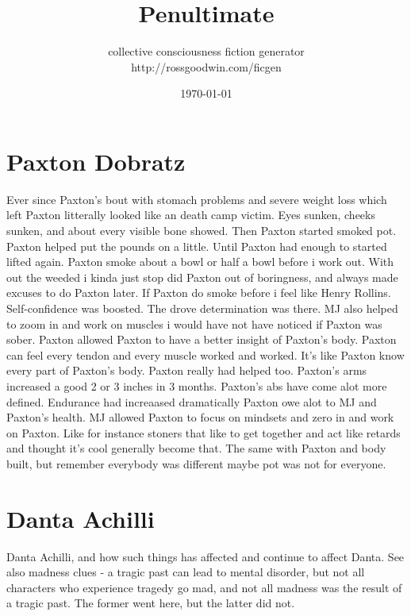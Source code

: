 \documentclass[12pt]{book}
\title{Penultimate}
\author{collective consciousness fiction generator\\http://rossgoodwin.com/ficgen}
\date{\today}
\begin{document}
\maketitle



\chapter{Paxton Dobratz}

Ever since Paxton's bout with stomach problems and severe weight loss which left Paxton litterally looked like an death camp victim. Eyes sunken, cheeks sunken, and about every visible bone showed. Then Paxton started smoked pot. Paxton helped put the pounds on a little. Until Paxton had enough to started lifted again. Paxton smoke about a bowl or half a bowl before i work out. With out the weeded i kinda just stop did Paxton out of boringness, and always made excuses to do Paxton later. If Paxton do smoke before i feel like Henry Rollins. Self-confidence was boosted. The drove determination was there. MJ also helped to zoom in and work on muscles i would have not have noticed if Paxton was sober. Paxton allowed Paxton to have a better insight of Paxton's body. Paxton can feel every tendon and every muscle worked and worked. It's like Paxton know every part of Paxton's body. Paxton really had helped too. Paxton's arms increased a good 2 or 3 inches in 3 months. Paxton's abs have come alot more defined. Endurance had increaased dramatically Paxton owe alot to MJ and Paxton's health. MJ allowed Paxton to focus on mindsets and zero in and work on Paxton. Like for instance stoners that like to get together and act like retards and thought it's cool generally become that. The same with Paxton and body built, but remember everybody was different maybe pot was not for everyone.






\chapter{Danta Achilli}

Danta Achilli, and how such things has affected and continue to affect Danta. See also madness clues - a tragic past can lead to mental disorder, but not all characters who experience tragedy go mad, and not all madness was the result of a tragic past. The former went here, but the latter did not.
\end{document}
